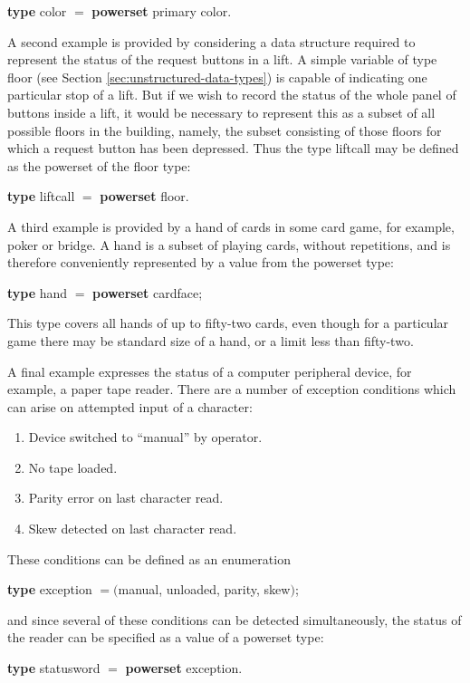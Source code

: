 \documentclass[twoside,11pt]{book}
\begin{document}
\quad \textbf{type} color $=$ \textbf{powerset} primary color.

A second example is provided by considering a data structure required to represent the status of the request buttons in a lift. A simple variable of type floor (see Section \ref{sec:unstructured-data-types}) is capable of indicating one particular stop of a lift.  But if we wish to record the status of the whole panel of buttons inside a lift, it would be necessary to represent this as a subset of all possible floors in the building, namely, the subset consisting of those floors for which a request button has been depressed. Thus the type liftcall may be defined as the powerset of the floor type:

\quad \textbf{type} liftcall $=$ \textbf{powerset} floor.

A third example is provided by a hand of cards in some card game, for example, poker or bridge. A hand is a subset of playing cards, without repetitions, and is therefore conveniently represented by a value from the powerset type:

\quad \textbf{type} hand $=$ \textbf{powerset} cardface;

\noindent
This type covers all hands of up to fifty-two cards, even though for a particular game there may be standard size of a hand, or a limit less than fifty-two.

A final example expresses the status of a computer peripheral device, for example, a paper tape reader. There are a number of exception conditions which can arise on attempted input of a character:

\begin{enumerate}[wide, nosep, label=(\arabic*)]
	\item Device switched to ``manual'' by operator.
	\item No tape loaded.
	\item Parity error on last character read.
	\item Skew detected on last character read.
\end{enumerate}

\noindent
These conditions can be defined as an enumeration

\quad \textbf{type} exception $= ($manual, unloaded, parity, skew$)$; 

\noindent
and since several of these conditions can be detected simultaneously, the status of the reader can be specified as a value of a powerset type:

\quad \textbf{type} statusword $=$ \textbf{powerset} exception.
\end{document}
